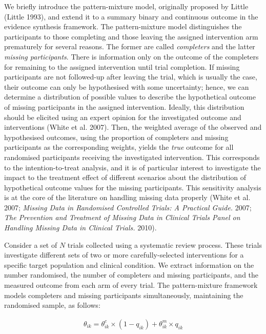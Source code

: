 We briefly introduce the pattern-mixture model, originally proposed by Little
(Little 1993), and extend it to a summary binary and continuous outcome in the
evidence synthesis framework. The pattern-mixture model distinguishes the participants
to those completing and those leaving the assigned intervention arm prematurely
for several reasons. The former are called \emph{completers} and the latter
\emph{missing participants}. There is information only on the outcome of the completers
for remaining to the assigned intervention until trial completion. If missing
participants are not followed-up after leaving the trial, which is usually the case,
their outcome can only be hypothesised with some uncertainty; hence, we can determine
a distribution of possible values to describe the hypothetical outcome of missing
participants in the assigned intervention. Ideally, this distribution should be elicited
using an expert opinion for the investigated outcome and interventions (White et al. 2007).
Then, the weighted average of the observed and hypothesised outcomes, using the
proportion of completers and missing participants as the corresponding weights,
yields the \emph{true} outcome for all randomised participants receiving the investigated
intervention. This corresponds to the intention-to-treat analysis, and it is of
particular interest to investigate the impact to the treatment effect of different
scenarios about the distribution of hypothetical outcome values for the missing
participants. This sensitivity analysis is at the core of the literature on
handling missing data properly (White et al. 2007; \emph{Missing Data in Randomised Controlled Trials: A Practical Guide.} 2007; \emph{The Prevention and Treatment of Missing Data in Clinical Trials Panel on Handling Missing Data in Clinical Trials.} 2010).

Consider a set of \(N\) trials collected using a systematic review process. These
trials investigate different sets of two or more carefully-selected interventions
for a specific target population and clinical condition. We extract information on
the number randomised, the number of completers and missing participants, and the
measured outcome from each arm of every trial. The pattern-mixture framework models
completers and missing participants simultaneously, maintaining the randomised
sample, as follows:

\[\begin{aligned}
\theta_{ik} = \theta^{c}_{ik} \times (1 - q_{ik}) + \theta^{m}_{ik} \times q_{ik}
\end{aligned}\]

